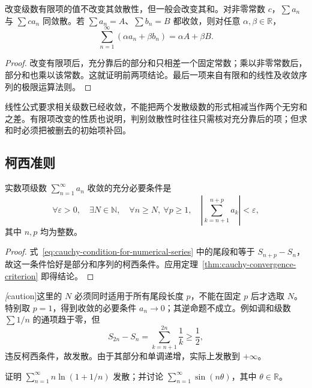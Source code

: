 \begin{proposition}[有限项改变与线性运算]
\label{prop:series-finite-changes-and-linearity}
改变级数有限项的值不改变其敛散性，但一般会改变其和。对非零常数 $c$，$\sum a_n$ 与 $\sum ca_n$ 同敛散。若 $\sum a_n=A$、$\sum b_n=B$ 都收敛，则对任意 $\alpha,\beta\in\mathbb R$，
\[
    \sum_{n=1}^{\infty}(\alpha a_n+\beta b_n)=\alpha A+\beta B.
\]
\end{proposition}

\begin{proof}
改变有限项后，充分靠后的部分和只相差一个固定常数；乘以非零常数后，部分和也乘以该常数。这就证明前两项结论。最后一项来自有限和的线性及收敛序列的极限运算法则。
\end{proof}

线性公式要求相关级数已经收敛，不能把两个发散级数的形式相减当作两个无穷和之差。有限项改变的性质也说明，判别敛散性时往往只需核对充分靠后的项；但求和时必须把被删去的初始项补回。

\subsection{柯西准则}
\label{subsec:cauchy-criterion-for-series}

\begin{theorem}[级数的柯西准则]
\label{thm:cauchy-criterion-for-numerical-series}
实数项级数 $\sum_{n=1}^{\infty}a_n$ 收敛的充分必要条件是
\begin{equation}
    \forall\varepsilon>0,\quad\exists N\in\mathbb N,\quad
    \forall n\geq N,\ \forall p\geq1,\quad
    \left|\sum_{k=n+1}^{n+p}a_k\right|<\varepsilon,
    \label{eq:cauchy-condition-for-numerical-series}
\end{equation}
其中 $n,p$ 均为整数。
\end{theorem}

\begin{proof}
式~\eqref{eq:cauchy-condition-for-numerical-series} 中的尾段和等于 $S_{n+p}-S_n$，故这一条件恰好是部分和序列的柯西条件。应用定理~\ref{thm:cauchy-convergence-criterion} 即得结论。
\end{proof}

\emph[caution]{这里的 $N$ 必须同时适用于所有尾段长度 $p$，不能在固定 $p$ 后才选取 $N$。}特别取 $p=1$，得到收敛的必要条件 $a_n\to0$；其逆命题不成立。例如调和级数 $\sum1/n$ 的通项趋于零，但
\[
    S_{2n}-S_n=\sum_{k=n+1}^{2n}\frac1k\geq\frac12,
\]
违反柯西条件，故发散。由于其部分和单调递增，实际上发散到 $+\infty$。

\begin{example}
\label{ex:series-term-test-divergence}
证明 $\sum_{n=1}^{\infty}n\ln(1+1/n)$ 发散；并讨论 $\sum_{n=1}^{\infty}\sin(n\theta)$，其中 $\theta\in\mathbb R$。
\end{example}

